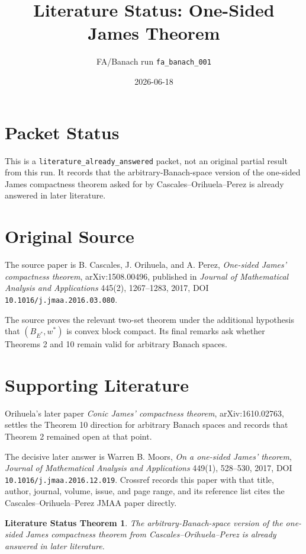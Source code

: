 \documentclass[11pt]{article}
\title{Literature Status: One-Sided James Theorem}
\author{FA/Banach run \texttt{fa\_banach\_001}}
\date{2026-06-18}
\newtheorem*{theorem}{Literature Status Theorem}
\begin{document}
\maketitle

\section*{Packet Status}

This is a \texttt{literature\_already\_answered} packet, not an original
partial result from this run. It records that the arbitrary-Banach-space
version of the one-sided James compactness theorem asked for by
Cascales--Orihuela--Perez is already answered in later literature.

\section*{Original Source}

The source paper is B. Cascales, J. Orihuela, and A. Perez,
\emph{One-sided James' compactness theorem}, arXiv:1508.00496, published in
\emph{Journal of Mathematical Analysis and Applications} 445(2), 1267--1283,
2017, DOI \texttt{10.1016/j.jmaa.2016.03.080}.

The source proves the relevant two-set theorem under the additional hypothesis
that \((B_{E^\ast},w^\ast)\) is convex block compact. Its final remarks ask
whether Theorems 2 and 10 remain valid for arbitrary Banach spaces.

\section*{Supporting Literature}

Orihuela's later paper \emph{Conic James' compactness theorem},
arXiv:1610.02763, settles the Theorem 10 direction for arbitrary Banach
spaces and records that Theorem 2 remained open at that point.

The decisive later answer is Warren B. Moors, \emph{On a one-sided James'
theorem}, \emph{Journal of Mathematical Analysis and Applications} 449(1),
528--530, 2017, DOI \texttt{10.1016/j.jmaa.2016.12.019}. Crossref records
this paper with that title, author, journal, volume, issue, and page range,
and its reference list cites the Cascales--Orihuela--Perez JMAA paper
directly.

\begin{theorem}
The arbitrary-Banach-space version of the one-sided James compactness theorem
from Cascales--Orihuela--Perez is already answered in later literature.
\end{theorem}
\end{document}
